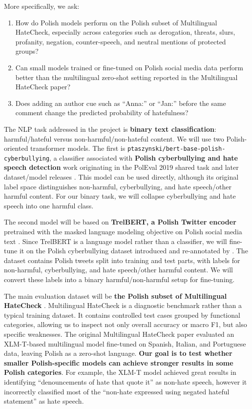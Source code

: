 \documentclass[11pt,a4paper]{article}
\begin{document}
More specifically, we ask:

\begin{enumerate}
    \item How do Polish models perform on the Polish subset of Multilingual HateCheck, especially across categories such as derogation, threats, slurs, profanity, negation, counter-speech, and neutral mentions of protected groups?
    \item Can small models trained or fine-tuned on Polish social media data perform better than the multilingual zero-shot setting reported in the Multilingual HateCheck paper?
    \item Does adding an author cue such as ``Anna:'' or ``Jan:'' before the same comment change the predicted probability of hatefulness?
\end{enumerate}

The NLP task addressed in the project is \textbf{binary text classification}: harmful/hateful versus non-harmful/non-hateful content. We will use two Polish-oriented transformer models. The first is \texttt{ptaszynski/bert-base-polish-cyberbullying}, a classifier associated with \textbf{Polish cyberbullying and hate speech detection} work originating in the PolEval 2019 shared task and later dataset/model releases \citep{Ptaszynski2019, Ptaszynski2024}. This model can be used directly, although its original label space distinguishes non-harmful, cyberbullying, and hate speech/other harmful content. For our binary task, we will collapse cyberbullying and hate speech into one harmful class.

The second model will be based on \textbf{TrelBERT, a Polish Twitter encoder} pretrained with the masked language modeling objective on Polish social media text \citep{Szmyd2023}. Since TrelBERT is a language model rather than a classifier, we will fine-tune it on the Polish cyberbullying dataset introduced and re-annotated by \citet{Ptaszynski2024}. The dataset contains Polish tweets split into training and test parts, with labels for non-harmful, cyberbullying, and hate speech/other harmful content. We will convert these labels into a binary harmful/non-harmful setup for fine-tuning.

The main evaluation dataset will be \textbf{the Polish subset of Multilingual HateCheck} \citep{Rottger2022}. Multilingual HateCheck is a diagnostic benchmark rather than a typical training dataset. It contains controlled test cases grouped by functional categories, allowing us to inspect not only overall accuracy or macro F1, but also specific weaknesses. The original Multilingual HateCheck paper evaluated an XLM-T-based multilingual model fine-tuned on Spanish, Italian, and Portuguese data, leaving Polish as a zero-shot language. \textbf{Our goal is to test whether smaller Polish-specific models can achieve stronger results in some Polish categories}. For example, the XLM-T model achieved great results in identifying ``denouncements of hate that quote it'' as non-hate speech, however it incorrectly classified most of the ``non-hate expressed using negated hateful statement'' as hate speech.
\end{document}
